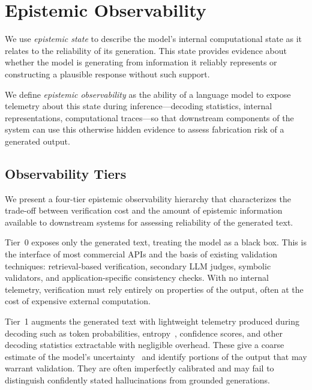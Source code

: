\section{Epistemic Observability}

We use \emph{epistemic state} to describe the model's internal computational state as
it relates to the reliability of its generation.
This state provides evidence about whether the model is generating from information
it reliably represents or constructing a plausible response without such support.

We define \emph{epistemic observability} as the ability of a language model to
expose telemetry about this state during inference---decoding statistics, internal representations,
computational traces---so that downstream components of the system can use this otherwise
hidden evidence to assess fabrication risk of a generated output.

\subsection{Observability Tiers}

We present a four-tier epistemic observability hierarchy that characterizes
the trade-off between verification cost and the amount of epistemic information available to downstream systems
for assessing reliability of the generated text.

Tier~0 exposes only the generated text, treating the model as a black box. This is the interface of most commercial APIs and the basis of existing validation techniques: retrieval-based verification, secondary LLM judges, symbolic validators, and application-specific consistency checks. With no internal telemetry, verification must rely entirely on properties of the output, often at the cost of expensive external computation.

Tier~1 augments the generated text with lightweight telemetry produced during decoding such as token probabilities, entropy~\cite{ling2024uncertainty,xiao2021hallucination}, confidence scores, and other decoding statistics extractable with negligible overhead. These give a coarse estimate of the model's uncertainty~\cite{shorinwa2025survey} and identify portions of the output that may warrant validation. They are often imperfectly calibrated and may fail to distinguish confidently stated hallucinations from grounded generations.

